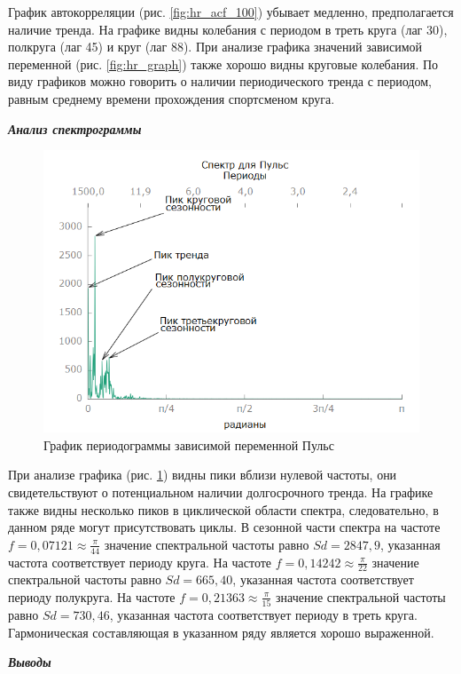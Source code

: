 \documentclass[a4paper,12pt]{article}
\begin{document}
График автокорреляции (рис. \ref{fig:hr_acf_100}) убывает медленно, предполагается наличие тренда. На графике видны колебания с периодом в треть круга (лаг 30), полкруга (лаг 45) и круг (лаг 88). При анализе графика значений зависимой переменной (рис. \ref{fig:hr_graph}) также хорошо видны круговые колебания. По виду графиков можно говорить о наличии периодического тренда с периодом, равным среднему времени прохождения спортсменом круга.

\textbf{\textit{Анализ спектрограммы}}

\begin{figure}[H]
	\centering
	\includegraphics[width=0.7\linewidth]{../[graphics]/hr_spectr}
	\caption{График периодограммы зависимой переменной Пульс}
	\label{fig:hr_spectr}
\end{figure}

При анализе графика (рис. \ref{fig:hr_spectr}) видны пики вблизи нулевой частоты, они свидетельствуют о потенциальном наличии долгосрочного тренда. На графике также видны несколько пиков в циклической области спектра, следовательно, в данном ряде могут присутствовать циклы. 
В сезонной части спектра на частоте $f = 0,07121 \approx \frac{\pi}{44}$ значение спектральной частоты равно $Sd = 2847,9$, указанная частота соответствует периоду круга. 
На частоте $f = 0,14242 \approx \frac{\pi}{22}$ значение спектральной частоты равно $Sd = 665,40$, указанная частота соответствует периоду полукруга. 
На частоте $f = 0,21363 \approx \frac{\pi}{15}$ значение спектральной частоты равно $Sd = 730,46$, указанная частота соответствует периоду в треть круга. Гармоническая составляющая в указанном ряду является хорошо выраженной.


\textbf{\textit{Выводы}}
\end{document}

